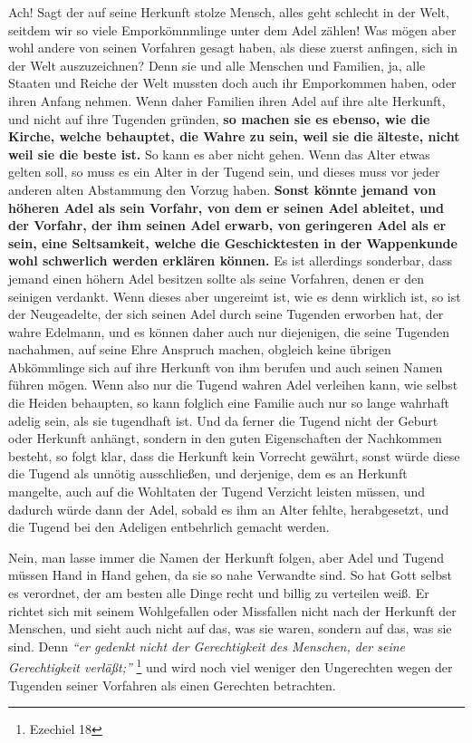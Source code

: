 Ach! Sagt der auf seine Herkunft stolze Mensch, alles geht schlecht in der Welt,
seitdem wir so viele Emporkömnmlinge unter dem Adel
zählen! Was mögen aber wohl
andere von seinen Vorfahren gesagt haben, als diese zuerst anfingen, sich in der
Welt auszuzeichnen? Denn sie und alle Menschen und Familien, ja, alle Staaten
und Reiche der Welt mussten doch auch ihr Emporkommen haben, oder ihren Anfang
nehmen. Wenn daher Familien ihren Adel auf ihre alte Herkunft, und nicht auf ihre
Tugenden gründen, \label{ref:11_04_abstammung} \textbf{so machen sie es ebenso, wie  die Kirche, welche behauptet,
die Wahre zu sein, weil sie die älteste, nicht weil sie die beste ist.} So kann
es aber nicht gehen. Wenn das Alter etwas gelten soll, so muss es ein Alter in
der Tugend sein, und dieses muss vor jeder anderen alten Abstammung den Vorzug
haben. \textbf{Sonst könnte jemand von höheren Adel als sein Vorfahr, von dem er
seinen
Adel ableitet, und der Vorfahr, der ihm seinen Adel erwarb, von geringeren Adel
als er sein, eine Seltsamkeit, welche die Geschicktesten in der
Wappenkunde wohl
schwerlich werden erklären können.} Es ist allerdings sonderbar, dass jemand
einen höhern Adel besitzen sollte als seine Vorfahren, denen er den seinigen
verdankt. Wenn dieses aber ungereimt ist, wie es denn wirklich ist, so ist der
Neugeadelte, der sich seinen Adel durch seine Tugenden erworben hat, der wahre
Edelmann, und es können daher auch nur diejenigen, die seine Tugenden
nachahmen, auf seine Ehre Anspruch machen, obgleich keine übrigen Abkömmlinge
sich auf ihre Herkunft von ihm berufen und auch seinen Namen führen mögen. Wenn
also nur die Tugend wahren Adel verleihen kann, wie selbst die
Heiden behaupten,
so kann folglich eine Familie auch nur so lange wahrhaft adelig sein, als sie
tugendhaft ist. Und da ferner die Tugend nicht der Geburt oder Herkunft anhängt,
sondern in den guten Eigenschaften der Nachkommen besteht, so folgt klar, dass
die Herkunft kein Vorrecht gewährt, sonst würde diese die Tugend als unnötig
ausschließen, und derjenige, dem es an Herkunft mangelte, auch auf die Wohltaten
der Tugend Verzicht leisten müssen, und dadurch würde dann der Adel, sobald es
ihm an Alter fehlte, herabgesetzt, und die Tugend bei den Adeligen entbehrlich
gemacht werden.

\medskip

Nein, man lasse immer die Namen der Herkunft folgen, aber Adel und Tugend müssen
Hand in Hand gehen, da sie so nahe Verwandte sind. So hat Gott selbst es
verordnet, der am besten alle Dinge recht und billig zu verteilen weiß. Er
richtet sich mit seinem Wohlgefallen oder Missfallen nicht nach der Herkunft der
Menschen, und sieht auch nicht auf das, was sie waren, sondern auf das, was sie
sind. Denn
\textit{"`er gedenkt nicht der Gerechtigkeit des Menschen, der seine
Gerechtigkeit verläßt;"'}
\footnote{Ezechiel 18}
und wird noch viel weniger den
Ungerechten wegen der Tugenden seiner Vorfahren als einen Gerechten betrachten.

